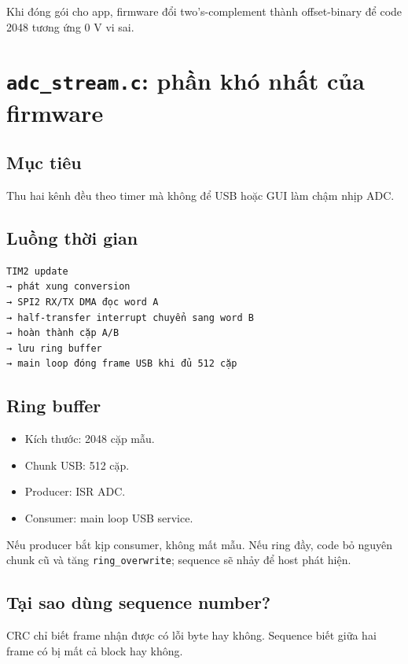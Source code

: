 \documentclass[12pt,a4paper,oneside]{article}
\newcommand{\inlinecode}[1]{\texttt{#1}}
\begin{document}
Khi đóng gói cho app, firmware đổi two’s-complement thành offset-binary để code 2048 tương ứng 0 V vi sai.

\section{\inlinecode{adc\_stream.c}: phần khó nhất của firmware}

\subsection{Mục tiêu}

Thu hai kênh đều theo timer mà không để USB hoặc GUI làm chậm nhịp ADC.

\subsection{Luồng thời gian}

\begin{Verbatim}[breaklines=true,breakanywhere=true,fontsize=\small]
TIM2 update
→ phát xung conversion
→ SPI2 RX/TX DMA đọc word A
→ half-transfer interrupt chuyển sang word B
→ hoàn thành cặp A/B
→ lưu ring buffer
→ main loop đóng frame USB khi đủ 512 cặp
\end{Verbatim}

\subsection{Ring buffer}

\begin{itemize}
\item Kích thước: 2048 cặp mẫu.
\item Chunk USB: 512 cặp.
\item Producer: ISR ADC.
\item Consumer: main loop USB service.
\end{itemize}

Nếu producer bắt kịp consumer, không mất mẫu. Nếu ring đầy, code bỏ nguyên chunk cũ và tăng \inlinecode{ring\_overwrite}; sequence sẽ nhảy để host phát hiện.

\subsection{Tại sao dùng sequence number?}

CRC chỉ biết frame nhận được có lỗi byte hay không. Sequence biết giữa hai frame có bị mất cả block hay không.
\end{document}

